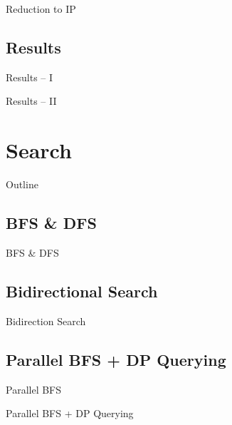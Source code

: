 \documentclass[t,10pt,
mathserif,xcolor=dvipsnames]{beamer}
\begin{document}
\begin{myframe}{Reduction to IP}

\end{myframe}

\subsection{Results}

\begin{myframe}{Results -- I}

\end{myframe}

\begin{myframe}{Results -- II}

\end{myframe}


\section{Search}

\begin{myframe}{Outline}

\end{myframe}

\subsection{BFS \& DFS}

\begin{myframe}{BFS \& DFS}

\end{myframe}

\subsection{Bidirectional Search}

\begin{myframe}{Bidirection Search}

\end{myframe}

\subsection{Parallel BFS + DP Querying}

\begin{myframe}{Parallel BFS}

\end{myframe}

\begin{myframe}{Parallel BFS + DP Querying}

\end{myframe}
\end{document}
